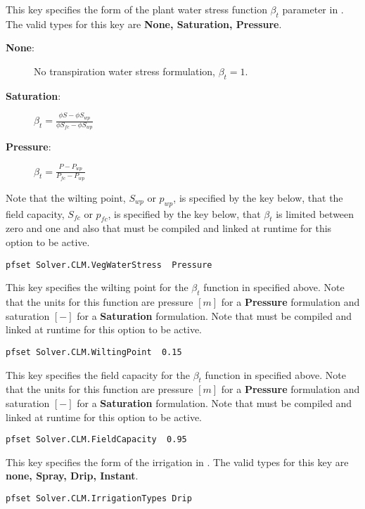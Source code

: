 {This key specifies the form of the plant water stress function $\beta_t$ parameter in .   The valid types for this key are {\bf None, Saturation, Pressure}. \begin{description}
\item[{\bf None}: ] No transpiration water stress formulation, $\beta_t=1$.
\item[{\bf Saturation}: ] $\beta_t=\frac{\phi S -\phi S_{wp}}{\phi S_{fc}-\phi S_{wp}}$
\item[{\bf Pressure}: ] $\beta_t=\frac{P - P_{wp}}{P_{fc}-P_{wp}}$
\end{description}
Note that the wilting point, $S_{wp}$ or $p_{wp}$, is specified by the key  below, that the field capacity, $S_{fc}$ or $p_{fc}$, is specified by the key  below, that $\beta_t$ is limited between zero and one and also that  must be compiled and linked at runtime for this option to be active.
}
\begin{display}\begin{verbatim}
pfset Solver.CLM.VegWaterStress  Pressure
\end{verbatim}\end{display}

{This key specifies the wilting point for the $\beta_t$ function in  specified above. Note that the units for this function are pressure $[m]$ for a {\bf Pressure} formulation and saturation $[-]$ for a {\bf Saturation} formulation. Note that  must be compiled and linked at runtime for this option to be active.
}
\begin{display}\begin{verbatim}
pfset Solver.CLM.WiltingPoint  0.15
\end{verbatim}\end{display}

{This key specifies the field capacity for the $\beta_t$ function in  specified above. Note that the units for this function are pressure $[m]$ for a {\bf Pressure} formulation and saturation $[-]$ for a {\bf Saturation} formulation. Note that  must be compiled and linked at runtime for this option to be active.
}
\begin{display}\begin{verbatim}
pfset Solver.CLM.FieldCapacity  0.95
\end{verbatim}\end{display}
{This key specifies the form of the irrigation in .  The valid types for this key are {\bf none, Spray, Drip, Instant}.
}
\begin{display}\begin{verbatim}
pfset Solver.CLM.IrrigationTypes Drip
\end{verbatim}\end{display}

